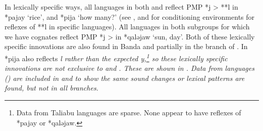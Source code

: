 In lexically specific ways,
all languages in both 
and  reflect PMP *j > **l in *pajay ‘rice’,
and *pija ‘how many?’ (see ,
and  for conditioning environments for reflexes of
**l in specific languages).
All languages in both subgroups for which we have cognates reflect
PMP *j > {\0} in *qaləjaw ‘sun, day’.
Both of these lexically specific innovations are also found in
Banda and partially in the  branch of .
In  *pija also reflects \it{l} rather than the expected
\it{y},\footnote{
		Data from Taliabu languages are sparse.
		None appear to have reflexes of *pajay or *qaləjaw.}
so these lexically specific innovations are not exclusive to 
and .
These are shown in .
Data from  languages ()
are included in 
and  to show the same sound changes or lexical patterns
are found, but not in all branches.

